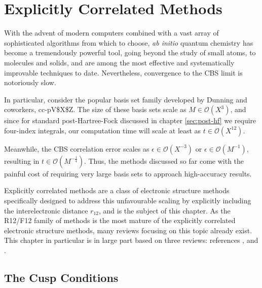 \chapter{Explicitly Correlated Methods}
\label{chap:explicit}

With the advent of modern computers combined with a vast array of sophisticated algorithms from which to choose, \emph{ab initio} quantum chemistry has become a tremendously powerful tool, going beyond the study of small atoms, to molecules and solids, and are among the most effective and systematically improvable techniques to date. Nevertheless, convergence to the \gls{CBS} limit is notoriously slow.

In particular, consider the popular basis set family developed by Dunning and coworkers, \gls{cc-pV$X$Z}.\cite{dunningGaussian1989a,woonGaussian1993,woonGaussian1994,petersonBenchmark1994,wilsonGaussian1996}
The size of these basis sets scale as $M\in\mathcal{O}(X^3)$, and since for standard post-Hartree-Fock discussed in chapter \ref{sec:post-hf} we require four-index integrals, our computation time will scale at least as $t\in\mathcal{O}(X^{12})$.\cite{klopperR122007}

Meanwhile, the \gls{CBS} correlation error scales as $\epsilon\in\mathcal{O}(X^{-3})$ \cite{helgakerBasisset1997,halkierBasisset1998} or $\epsilon\in\mathcal{O}(M^{-1})$,\cite{klopperInitio1995} resulting in $t\in\mathcal{O}(M^{-\frac 14})$. Thus, the methods discussed so far come with the painful cost of requiring very large basis sets to approach high-accuracy results.

Explicitly correlated methods are a class of electronic structure methods specifically designed to address this unfavourable scaling by explicitly including the interelectronic distance $r_{12}$, and is the subject of this chapter. As the R12/F12 family of methods is the most mature of the explicitly correlated electronic structure methods, many reviews focusing on this topic already exist. This chapter in particular is in large part based on three reviews: references ,  and .


\section{The Cusp Conditions}
\label{sec:cusp}

